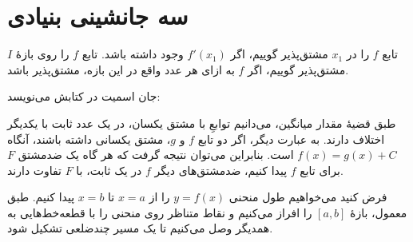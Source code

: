 \section{سه جانشینی بنیادی}
تابع $f$ را در $x_1$ مشتق‌پذیر گوییم، اگر $f'(x_1)$ وجود داشته باشد.
تابع $f$ را روی بازهٔ $I$ مشتق‌پذیر گوییم، اگر $f$ به ازای هر عدد واقع در این بازه، مشتق‌پذیر باشد.

جان اسمیت در کتابش می‌نویسد:
\begin{pquote}
طبق قضیهٔ مقدار میانگین، می‌دانیم توابعِ با مشتق یکسان، در یک عدد ثابت
 با یکدیگر اختلاف دارند. به عبارت دیگر، اگر  دو تابع $f$ و $g$، مشتق یکسانی داشته باشند، آنگاه $f(x)=g(x)+C$ است. بنابراین می‌توان نتیجه 
 گرفت که هر گاه یک ضدمشتق $F$ برای تابع $f$ پیدا کنیم، ضدمشتق‌های دیگر $f$ در یک ثابت، با $F$ تفاوت دارند.
\end{pquote}
فرض کنید می‌خواهیم طول منحنی $y=f(x)$ را از $x=a$ تا $x=b$ پیدا کنیم.
طبق معمول، بازهٔ $[a,b]$ را افراز می‌کنیم و نقاط متناظر روی منحنی را با قطعه‌خط‌هایی به همدیگر وصل می‌کنیم تا یک مسیر چندضلعی تشکیل شود.


 


